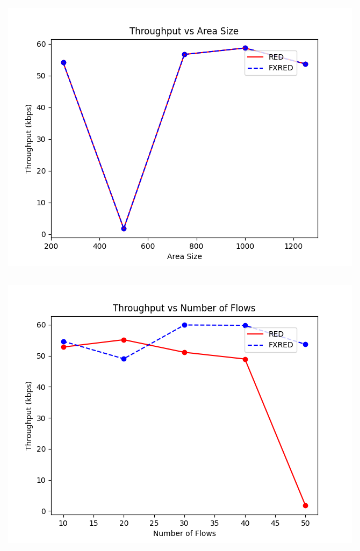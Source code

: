 \documentclass[10pt]{report}
\begin{document}
\begin{figure}
    \centering
    \begin{subfigure}{.5\textwidth}
        \includegraphics[width=1\linewidth]{static/graphs/wireless/Throughput vs Area Size.png}
    \end{subfigure}%
    \begin{subfigure}{.5\textwidth}
        \includegraphics[width=1\linewidth]{static/graphs/wireless/Throughput vs Number of Flows.png}
    \end{subfigure}
    \begin{subfigure}{.5\textwidth}

\end{subfigure}
\end{figure}
\end{document}
